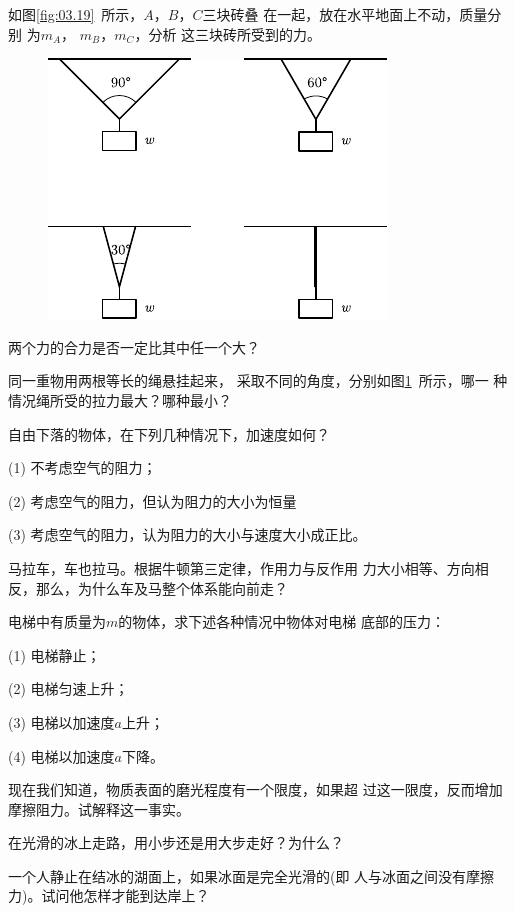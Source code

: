 \begin{questions}
\question 如图\ref{fig:03.19}~所示，$ A $，$ B $，$ C $三块砖叠
在一起，放在水平地面上不动，质量分别
为$ m_A $， $ m _ B $，$ m_C $，分析
这三块砖所受到的力。

\begin{figure}
    \centering
    \includegraphics{figure/fig03.20}
    \caption{}
    \label{fig:03.20}
\end{figure}
\question 两个力的合力是否一定比其中任一个大？

\question 同一重物用两根等长的绳悬挂起来，
采取不同的角度，分别如图\ref{fig:03.20}~所示，哪一
种情况绳所受的拉力最大？哪种最小？

\question 自由下落的物体，在下列几种情况下，加速度如何？

(1) 不考虑空气的阻力；

(2) 考虑空气的阻力，但认为阻力的大小为恒量

(3) 考虑空气的阻力，认为阻力的大小与速度大小成正比。

\question 马拉车，车也拉马。根据牛顿第三定律，作用力与反作用
力大小相等、方向相反，那么，为什么车及马整个体系能向前走？

\question 电梯中有质量为$ m $的物体，求下述各种情况中物体对电梯
底部的压力：

(1) 电梯静止；

(2) 电梯匀速上升；

(3) 电梯以加速度$ a $上升；

(4) 电梯以加速度$ a $下降。

\question 现在我们知道，物质表面的磨光程度有一个限度，如果超
过这一限度，反而增加摩擦阻力。试解释这一事实。

\question 在光滑的冰上走路，用小步还是用大步走好？为什么？

\question 一个人静止在结冰的湖面上，如果冰面是完全光滑的(即
人与冰面之间没有摩擦力)。试问他怎样才能到达岸上？


\end{questions}
